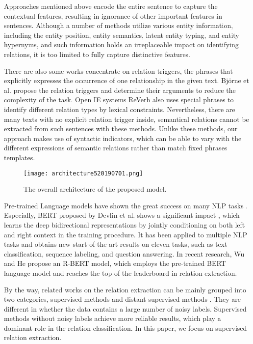 \documentclass[conference]{IEEEtran}
\begin{document}
Approaches mentioned above encode the entire sentence to capture the contextual features, resulting in ignorance of other important features in sentences. Although a number of methods utilize various entity information, including the entity position, entity semantics, latent entity typing, and entity hypernyms, and such information holds an irreplaceable impact on identifying relations, it is too limited to fully capture distinctive features.

There are also some works concentrate on relation triggers, the phrases that explicitly expresses the occurrence of one relationship in the given text. Bj{\"o}rne et al. \cite{bjorne2011extracting} propose the relation triggers and determine their arguments to reduce the complexity of the task. Open IE systems ReVerb \cite{fader2014open} also uses special phrases to identify different relation types by lexical constraints. Nevertheless, there are many texts with no explicit relation trigger inside, semantical relations cannot be extracted from such sentences with these methods. Unlike these methods, our approach makes use of syntactic indicators, which can be able to vary with the different expressions of semantic relations rather than match fixed phrases templates.

\begin{figure*}
\centerline{\texttt{[image: architecture520190701.png]}}
\caption{The overall architecture of the proposed model.}
\label{fig:architecture}
\end{figure*}

Pre-trained Language models have shown the great success on many NLP tasks \cite{dai2015semi}\cite{howard2018universal}. Especially, BERT proposed by Devlin et al. shows a significant impact \cite{devlin2019bert}, which learns the deep bidirectional representations by jointly conditioning on both left and right context in the training procedure. It has been applied to multiple NLP tasks and obtains new start-of-the-art results on eleven tasks, such as text classification, sequence labeling, and question answering. In recent research, Wu and He \cite{wu2019enriching} propose an R-BERT model, which employs the pre-trained BERT language model and reaches the top of the leaderboard in relation extraction.

By the way, related works on the relation extraction can be mainly grouped into two categories, supervised methods \cite{zeng2014relation}\cite{xiao2016semantic}\cite{socher2012semantic} and distant supervised methods \cite{mintz2009distant, zeng2015distant, min2013distant}. They are different in whether the data contains a large number of noisy labels. Supervised methods without noisy labels achieve more reliable results, which play a dominant role in the relation classification. In this paper, we focus on supervised relation extraction.
\end{document}
